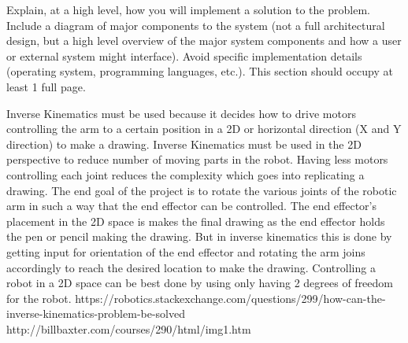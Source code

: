 Explain, at a high level, how you will implement a solution to the problem. Include a diagram of major components
to the system (not a full architectural design, but a high level overview of the major system components and
how a user or external system might interface). Avoid specific implementation details (operating system, programming languages, etc.).
This section should occupy at least 1 full page.

Inverse Kinematics must be used because it decides how to drive motors controlling the arm to a certain position in a 2D or horizontal direction (X and Y direction) to make a drawing.
Inverse Kinematics must be used in the 2D perspective to reduce number of moving parts in the robot. Having less motors
controlling each joint reduces the complexity which goes into replicating a drawing.
The end goal of the project is to rotate the various joints of the robotic arm in such a way that the end effector can be controlled.
The end effector’s placement in the 2D space is makes the final drawing as the end effector holds the pen or pencil making the drawing.
But in inverse kinematics this is done by getting input for orientation of the end effector and rotating the arm joins accordingly to reach the desired location to make the drawing. 
Controlling a robot in a 2D space can be best done by using only having 2 degrees of freedom for the robot. 
https://robotics.stackexchange.com/questions/299/how-can-the-inverse-kinematics-problem-be-solved
http://billbaxter.com/courses/290/html/img1.htm
